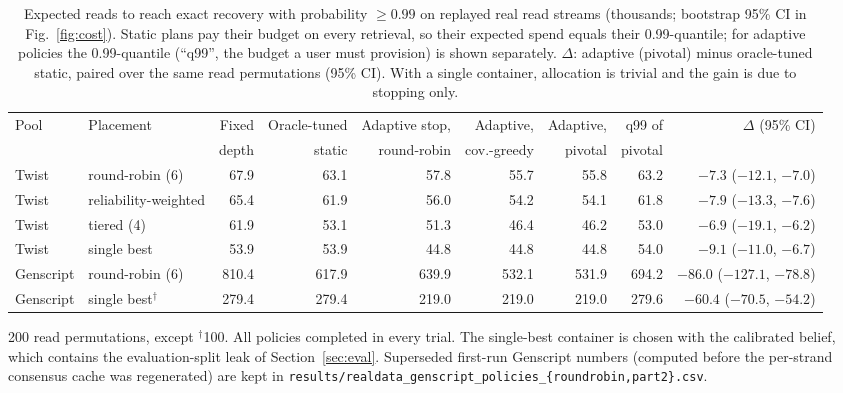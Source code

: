 \begin{table}[!t]
\centering
\caption{Expected reads to reach exact recovery with probability $\ge0.99$ on replayed real read streams
(thousands; bootstrap 95\% CI in Fig.~\ref{fig:cost}).  Static plans pay their budget on every retrieval, so their
expected spend equals their 0.99-quantile; for adaptive policies the 0.99-quantile (``q99'', the budget a user must
provision) is shown separately.  $\Delta$: adaptive (pivotal) minus oracle-tuned static, paired over the same read
permutations (95\% CI).  With a single container, allocation is trivial and the gain is due to stopping only.}
\label{tab:baselines}
\footnotesize
\begin{tabular}{@{}llrrrrrrr@{}}
\toprule
Pool & Placement & Fixed & Oracle-tuned & Adaptive stop, & Adaptive, & Adaptive, & q99 of & $\Delta$ (95\% CI) \\
 & & depth & static & round-robin & cov.-greedy & pivotal & pivotal & \\
\midrule
Twist & round-robin (6) & 67.9 & 63.1 & 57.8 & 55.7 & 55.8 & 63.2 & $-7.3$ ($-12.1$, $-7.0$) \\
Twist & reliability-weighted & 65.4 & 61.9 & 56.0 & 54.2 & 54.1 & 61.8 & $-7.9$ ($-13.3$, $-7.6$) \\
Twist & tiered (4) & 61.9 & 53.1 & 51.3 & 46.4 & 46.2 & 53.0 & $-6.9$ ($-19.1$, $-6.2$) \\
Twist & single best & 53.9 & 53.9 & 44.8 & 44.8 & 44.8 & 54.0 & $-9.1$ ($-11.0$, $-6.7$) \\
Genscript & round-robin (6) & 810.4 & 617.9 & 639.9 & 532.1 & 531.9 & 694.2 & $-86.0$ ($-127.1$, $-78.8$) \\
Genscript & single best$^{\dagger}$ & 279.4 & 279.4 & 219.0 & 219.0 & 219.0 & 279.6 & $-60.4$ ($-70.5$, $-54.2$) \\
\bottomrule
\end{tabular}

\vspace{2pt}
\parbox{\textwidth}{\scriptsize 200 read permutations, except $^{\dagger}$100.  All policies completed in every trial.
The single-best container is chosen with the calibrated belief, which contains the evaluation-split leak of
Section~\ref{sec:eval}.  Superseded first-run Genscript numbers (computed before the per-strand consensus cache was
regenerated) are kept in \texttt{results/realdata\_genscript\_policies\_\{roundrobin,part2\}.csv}.}
\end{table}

